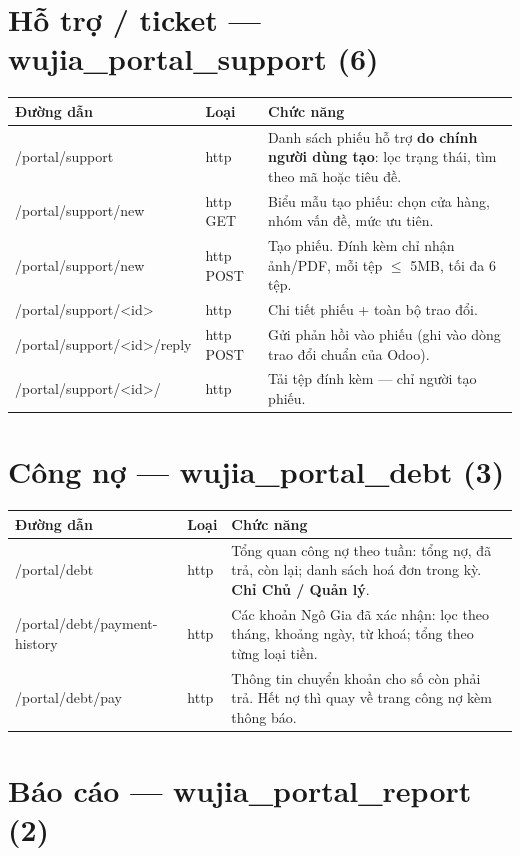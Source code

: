 \documentclass[11pt,a4paper]{report}
\newcommand{\rt}[1]{{\ttfamily\footnotesize #1}}
\begin{document}
\section{Hỗ trợ / ticket --- \rt{wujia\_portal\_support} (6)}

{\small
\begin{longtable}{@{}L{5.4cm}L{1.5cm}L{7.5cm}@{}}
\toprule
\textbf{Đường dẫn} & \textbf{Loại} & \textbf{Chức năng} \\
\midrule
\endhead
\rt{/portal/support} & http & Danh sách phiếu hỗ trợ \textbf{do chính người dùng tạo}: lọc trạng thái, tìm theo mã hoặc tiêu đề. \\
\rt{/portal/support/new} & http GET & Biểu mẫu tạo phiếu: chọn cửa hàng, nhóm vấn đề, mức ưu tiên. \\
\rt{/portal/support/new} & http POST & Tạo phiếu. Đính kèm chỉ nhận ảnh/PDF, mỗi tệp $\leq$ 5MB, tối đa 6 tệp. \\
\rt{/portal/support/<id>} & http & Chi tiết phiếu + toàn bộ trao đổi. \\
\rt{/portal/support/<id>/reply} & http POST & Gửi phản hồi vào phiếu (ghi vào dòng trao đổi chuẩn của Odoo). \\
\rt{/portal/support/<id>/}\allowbreak\rt{attachment/<id>} & http & Tải tệp đính kèm — chỉ người tạo phiếu. \\
\bottomrule
\end{longtable}}

\section{Công nợ --- \rt{wujia\_portal\_debt} (3)}

{\small
\begin{longtable}{@{}L{5.4cm}L{1.5cm}L{7.5cm}@{}}
\toprule
\textbf{Đường dẫn} & \textbf{Loại} & \textbf{Chức năng} \\
\midrule
\endhead
\rt{/portal/debt} & http & Tổng quan công nợ theo tuần: tổng nợ, đã trả, còn lại; danh sách hoá đơn trong kỳ. \textbf{Chỉ Chủ / Quản lý}. \\
\rt{/portal/debt/payment-history} & http & Các khoản Ngô Gia đã xác nhận: lọc theo tháng, khoảng ngày, từ khoá; tổng theo từng loại tiền. \\
\rt{/portal/debt/pay} & http & Thông tin chuyển khoản cho số còn phải trả. Hết nợ thì quay về trang công nợ kèm thông báo. \\
\bottomrule
\end{longtable}}

\section{Báo cáo --- \rt{wujia\_portal\_report} (2)}
\end{document}
